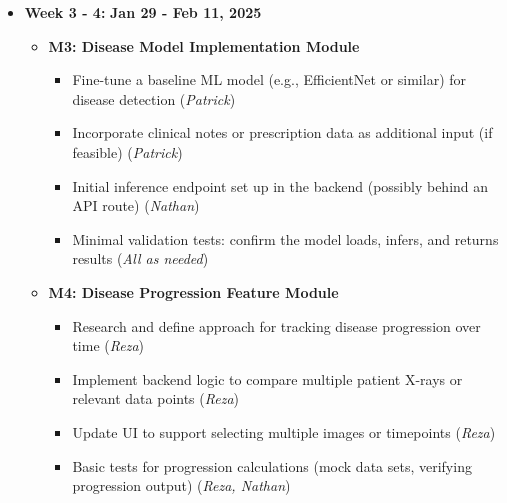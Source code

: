 \documentclass[12pt, titlepage]{article}
\newcommand{\rt}[1]{\textbf{#1}}
\begin{document}
\begin{itemize}
\item \textbf{Week 3 - 4:} \rt{Jan 29 - Feb 11, 2025} \begin{itemize} \item \textbf{M3: Disease Model Implementation Module} \begin{itemize} \item Fine-tune a baseline ML model (e.g., EfficientNet or similar) for disease detection (\textit{Patrick}) \item Incorporate clinical notes or prescription data as additional input (if feasible) (\textit{Patrick}) \item Initial inference endpoint set up in the backend (possibly behind an API route) (\textit{Nathan}) \item Minimal validation tests: confirm the model loads, infers, and returns results (\textit{All as needed}) \end{itemize} \item \textbf{M4: Disease Progression Feature Module} \begin{itemize} \item Research and define approach for tracking disease progression over time (\textit{Reza}) \item Implement backend logic to compare multiple patient X-rays or relevant data points (\textit{Reza}) \item Update UI to support selecting multiple images or timepoints (\textit{Reza}) \item Basic tests for progression calculations (mock data sets, verifying progression output) (\textit{Reza, Nathan}) \end{itemize} \end{itemize}


\end{itemize}
\end{document}
